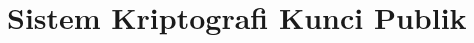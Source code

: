 \documentclass[../main.tex]{subfiles}
\begin{document}
\chapter{Sistem Kriptografi Kunci Publik}
\end{document}
